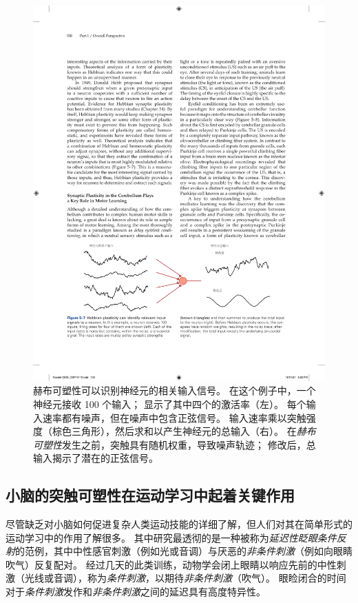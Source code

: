 \begin{figure}[htbp]
	\centering
	\includegraphics[width=1.0\linewidth]{chap05/fig_5_7}
	\caption{赫布可塑性可以识别神经元的相关输入信号。
		在这个例子中，一个神经元接收 100 个输入；
		显示了其中四个的激活率（左）。
		每个输入速率都有噪声，但在噪声中包含正弦信号。
		输入速率乘以突触强度（棕色三角形），然后求和以产生神经元的总输入（右）。
		在\textit{赫布可塑性}发生之前，突触具有随机权重，导致噪声轨迹；
		修改后，总输入揭示了潜在的正弦信号。}
	\label{fig:5_7}
\end{figure}


\subsection{小脑的突触可塑性在运动学习中起着关键作用}

尽管缺乏对小脑如何促进复杂人类运动技能的详细了解，但人们对其在简单形式的运动学习中的作用了解很多。
其中研究最透彻的是一种被称为\textit{延迟性眨眼条件反射}的范例，其中中性感官刺激（例如光或音调）与厌恶的\textit{非条件刺激}（例如向眼睛吹气）反复配对。
经过几天的此类训练，动物学会闭上眼睛以响应先前的中性刺激（光线或音调），称为\textit{条件刺激}，以期待\textit{非条件刺激}（吹气）。
眼睑闭合的时间对于\textit{条件刺激}发作和\textit{非条件刺激}之间的延迟具有高度特异性。


